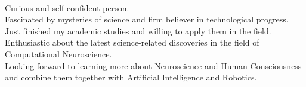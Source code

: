 \documentclass[9pt]{developercv} %
\begin{document}
\begin{minipage}[t]{0.45\textwidth} %
	\vspace{-\baselineskip} %
        \\
        Curious and self-confident person.\\
        Fascinated by mysteries of science and firm believer in technological progress.\\
        Just finished my academic studies and willing to apply them in the field.\\
        Enthusiastic about the latest science-related discoveries in the field of Computational Neuroscience.\\
        Looking forward to learning more about Neuroscience and Human Consciousness and combine them together with Artificial Intelligence and Robotics.

\vspace{0.5cm}

\\
\begin{center}
\end{center}


\end{minipage}
\hfill %
\begin{minipage}[t]{0.5\textwidth} %
	\vspace{-\baselineskip} %
	\begin{barchart}{5.5}
	\end{barchart}
        \vspace{0.5cm}
	\begin{barchart}{5.5}
	\end{barchart}
\end{minipage}
\end{document}
